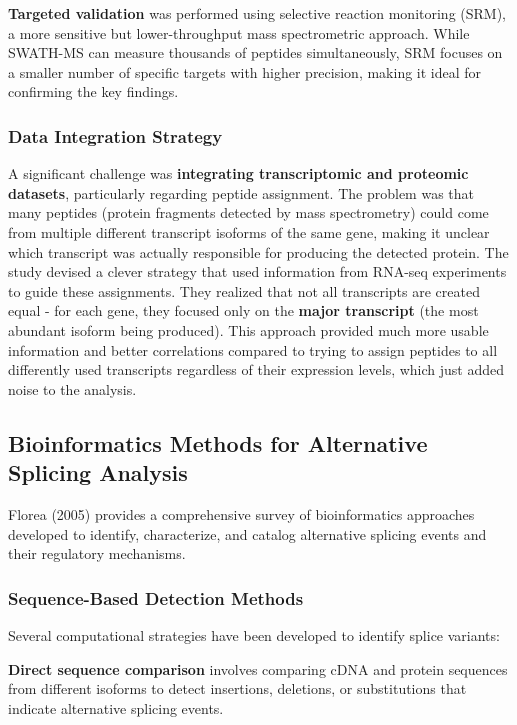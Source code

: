 \documentclass[12pt,a4paper]{article}
\begin{document}
\textbf{Targeted validation} was performed using selective reaction monitoring (SRM), a more sensitive but lower-throughput mass spectrometric approach. While SWATH-MS can measure thousands of peptides simultaneously, SRM focuses on a smaller number of specific targets with higher precision, making it ideal for confirming the key findings.

\subsubsection{Data Integration Strategy}

A significant challenge was \textbf{integrating transcriptomic and proteomic datasets}, particularly regarding peptide assignment. The problem was that many peptides (protein fragments detected by mass spectrometry) could come from multiple different transcript isoforms of the same gene, making it unclear which transcript was actually responsible for producing the detected protein. The study devised a clever strategy that used information from RNA-seq experiments to guide these assignments. They realized that not all transcripts are created equal - for each gene, they focused only on the \textbf{major transcript} (the most abundant isoform being produced). This approach provided much more usable information and better correlations compared to trying to assign peptides to all differently used transcripts regardless of their expression levels, which just added noise to the analysis.

\subsection{Bioinformatics Methods for Alternative Splicing Analysis}

Florea (2005) provides a comprehensive survey of bioinformatics approaches developed to identify, characterize, and catalog alternative splicing events and their regulatory mechanisms.

\subsubsection{Sequence-Based Detection Methods}

Several computational strategies have been developed to identify splice variants:

\textbf{Direct sequence comparison} involves comparing cDNA and protein sequences from different isoforms to detect insertions, deletions, or substitutions that indicate alternative splicing events.
\end{document}
